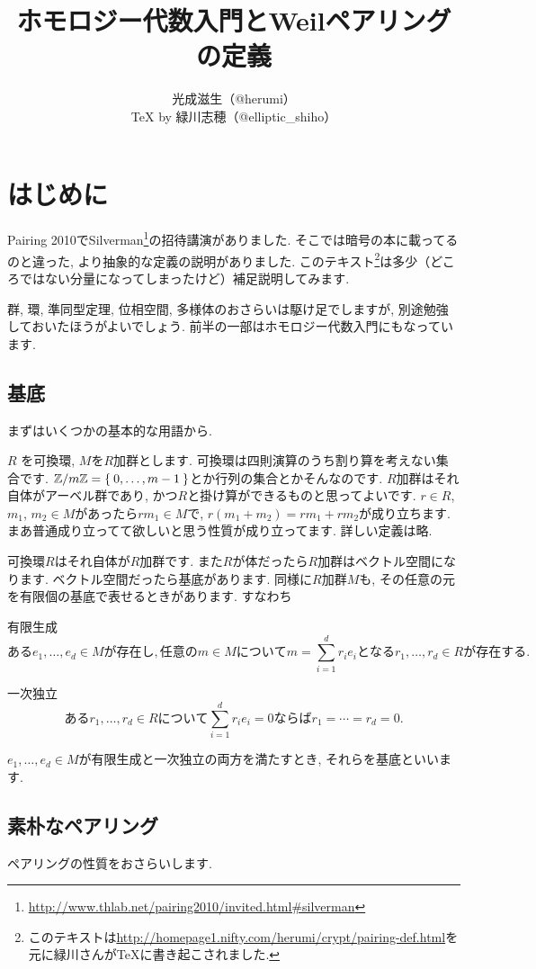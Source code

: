 \documentclass{jsarticle}
\title{ホモロジー代数入門とWeilペアリングの定義}
\author{光成滋生（@herumi）\\{\TeX} by 緑川志穂（@elliptic\_shiho）}
\date{}
\newcommand{\ZZ}{\mathbb{Z}}
\theoremstyle{definition}
\newcommand{\mydescription}[1]{
\begin{description}
\setlength{\itemindent}{2zw}
\setlength{\leftskip}{-2zw}
\setlength{\labelsep}{1zw}
#1
\end{description}
}
\numberwithin{theorem}{section}
\begin{document}
\maketitle

\tableofcontents

\section{はじめに}
Pairing 2010でSilverman\footnote{\url{http://www.thlab.net/pairing2010/invited.html\#silverman}}の招待講演がありました.
そこでは暗号の本に載ってるのと違った, より抽象的な定義の説明がありました.
このテキスト\footnote{このテキストは\url{http://homepage1.nifty.com/herumi/crypt/pairing-def.html}を元に緑川さんがTeXに書き起こされました.}は多少（どころではない分量になってしまったけど）補足説明してみます.

群, 環, 準同型定理, 位相空間, 多様体のおさらいは駆け足でしますが, 別途勉強しておいたほうがよいでしょう.
前半の一部はホモロジー代数入門にもなっています.

\subsection{基底}
まずはいくつかの基本的な用語から.

$R$ を可換環, $M$を$R$加群とします. 可換環は四則演算のうち割り算を考えない集合です. $\ZZ/m\ZZ=\Set{0, \dots, m-1}$とか行列の集合とかそんなのです.
$R$加群はそれ自体がアーベル群であり, かつ$R$と掛け算ができるものと思ってよいです. $r \in R$, $m_1$, $m_2 \in M$があったら$rm_1\in M$で,
$r(m_1+m_2) = rm_1+rm_2$が成り立ちます. まあ普通成り立ってて欲しいと思う性質が成り立ってます. 詳しい定義は略.

可換環$R$はそれ自体が$R$加群です. また$R$が体だったら$R$加群はベクトル空間になります.
ベクトル空間だったら基底があります.
同様に$R$加群$M$も, その任意の元を有限個の基底で表せるときがあります. すなわち
\mydescription{
\item[有限生成]
\[
ある e_1, \ldots, e_d\in M が存在し, 任意の m\in Mについて m = \sum_{i=1}^d r_i e_i となる r_1, \ldots, r_d \in R が存在する.
\]
\item[一次独立]
\[
あるr_1, \ldots, r_d \in Rについて \sum_{i=1}^d r_i e_i = 0 ならば r_1=\cdots=r_d=0.
\]
}

$e_1, \ldots, e_d\in M$が有限生成と一次独立の両方を満たすとき, それらを基底といいます.

\subsection{素朴なペアリング}
ペアリングの性質をおさらいします.
\end{document}
